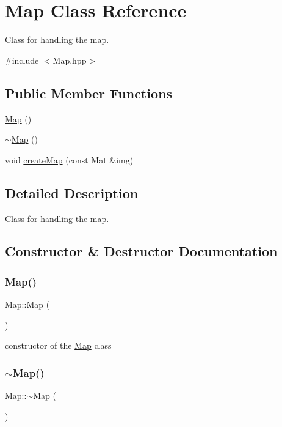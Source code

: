 \hypertarget{class_map}{}\section{Map Class Reference}
\label{class_map}


Class for handling the map.  




{\ttfamily \#include $<$Map.\+hpp$>$}

\subsection*{Public Member Functions}
\begin{DoxyCompactItemize}
\item 
\mbox{\hyperlink{class_map_a0f5ad0fd4563497b4214038cbca8b582}{Map}} ()
\item 
\mbox{\hyperlink{class_map_aa403fbe09394ccf39747588f5168e3b2}{$\sim$\+Map}} ()
\item 
void \mbox{\hyperlink{class_map_a02537656e91e97077dfdfc5d84c3027b}{create\+Map}} (const Mat \&img)
\end{DoxyCompactItemize}


\subsection{Detailed Description}
Class for handling the map. 

\subsection{Constructor \& Destructor Documentation}
\mbox{\label{class_map_a0f5ad0fd4563497b4214038cbca8b582}} 
\subsubsection{\texorpdfstring{Map()}{Map()}}
{\footnotesize\ttfamily Map\+::\+Map (\begin{DoxyParamCaption}{ }\end{DoxyParamCaption})}

constructor of the \mbox{\hyperlink{class_map}{Map}} class \mbox{\label{class_map_aa403fbe09394ccf39747588f5168e3b2}} 
\subsubsection{\texorpdfstring{$\sim$\+Map()}{~Map()}}
{\footnotesize\ttfamily Map\+::$\sim$\+Map (\begin{DoxyParamCaption}{ }\end{DoxyParamCaption})}

